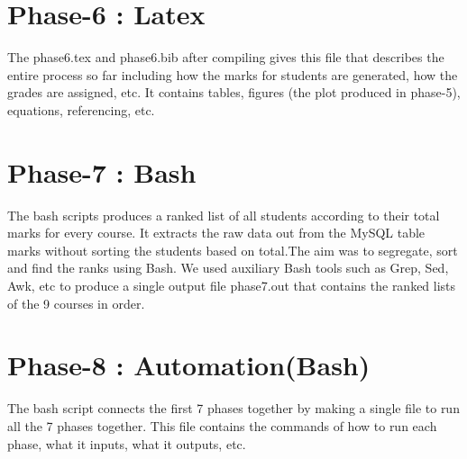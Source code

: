 \documentclass[11pt]{article}
\begin{document}
 \section{Phase-6 : Latex}
 \label{sec:ph6}
 The phase6.tex and phase6.bib after compiling gives this file  that describes the entire process so far including how the marks for students are generated, how the grades are assigned, etc. It contains tables, figures (the plot produced in phase-5), equations, referencing, etc.
 
 \section{Phase-7 : Bash}
 \label{sec:ph7}
 The bash scripts produces a ranked list of all students according to their total marks for every course. It extracts the raw data out from the MySQL table marks without sorting the students based on total.The aim was to segregate, sort and find the ranks using Bash. We used auxiliary Bash tools such as Grep, Sed, Awk, etc to produce a single output file phase7.out that contains the ranked lists of the 9 courses in order.
 
 \section{Phase-8 : Automation(Bash)}
 \label{sec:ph8}
 The bash script connects the first 7 phases together by making a single file to run all the 7 phases together. This file  contains the commands of how to run each phase, what it inputs, what it outputs, etc.
 
\end{document}
